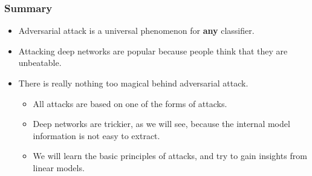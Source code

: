 \documentclass[8pt,dvipsnames]{beamer}
\begin{document}
\begin{frame}
	\frametitle{Summary}
	\begin{itemize}
		\item Adversarial attack is a universal phenomenon for \textbf{any} classifier. 
		\item Attacking deep networks are popular because people think that they are unbeatable.
		\item There is really nothing too magical behind adversarial attack.
		\begin{itemize}
			\item All attacks are based on one of the forms of attacks. 
			\item Deep networks are trickier, as we will see, because the internal model information is not easy to extract.
			\item We will learn the basic principles of attacks, and try to gain insights from linear models.
		\end{itemize}
	\end{itemize}
\end{frame}
\end{document}
